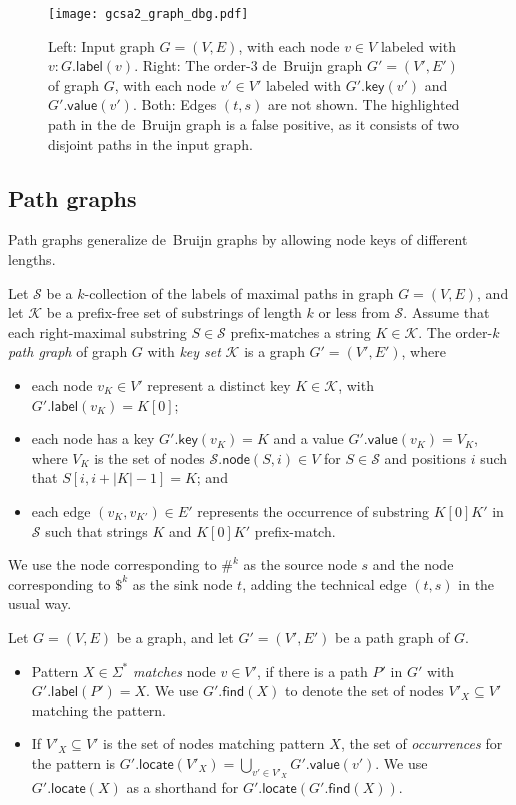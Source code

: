 \documentclass[a4paper,UKenglish]{lipics-v2016}
\newcommand{\abs}[1]{\ensuremath{\lvert #1 \rvert}}
\newcommand{\find}{\ensuremath{\mathsf{find}}}
\newcommand{\locate}{\ensuremath{\mathsf{locate}}}
\newcommand{\glabel}{\ensuremath{\mathsf{label}}}
\newcommand{\gkey}{\ensuremath{\mathsf{key}}}
\newcommand{\gvalue}{\ensuremath{\mathsf{value}}}
\newcommand{\gnode}{\ensuremath{\mathsf{node}}}
\newcommand{\kcollection}[1]{$#1$\nobreakdash-collection}
\newcommand{\orderk}[1]{order\nobreakdash-$#1$}
\begin{document}
\begin{figure}[t!]
\texttt{[image: gcsa2\_graph\_dbg.pdf]}
\caption{Left: Input graph $G = (V, E)$, with each node $v \in V$ labeled with $v:G.\glabel(v)$. Right: The \orderk{3} de~Bruijn graph $G' = (V', E')$ of graph $G$, with each node $v' \in V'$ labeled with $G'.\gkey(v')$ and $G'.\gvalue(v')$. Both: Edges $(t, s)$ are not shown. The highlighted path in the de~Bruijn graph is a false positive, as it consists of two disjoint paths in the input graph.}\label{figure:graph-dbg}
\end{figure}

\subsection{Path graphs}

Path graphs generalize de~Bruijn graphs by allowing node keys of different lengths.

\begin{definition}
Let $\mathcal{S}$ be a \kcollection{k} of the labels of maximal paths in graph $G = (V, E)$, and let $\mathcal{K}$ be a prefix-free set of substrings of length $k$ or less from $\mathcal{S}$. Assume that each right-maximal substring $S \in \mathcal{S}$ prefix-matches a string $K \in \mathcal{K}$. The \orderk{k} \emph{path graph} of graph $G$ with \emph{key set} $\mathcal{K}$ is a graph $G' = (V', E')$, where
\begin{itemize}
\item each node $v_{K} \in V'$ represent a distinct key $K \in \mathcal{K}$, with $G'.\glabel(v_{K}) = K[0]$;
\item each node has a key $G'.\gkey(v_{K}) = K$ and a value $G'.\gvalue(v_{K}) = V_{K}$, where $V_{K}$ is the set of nodes $\mathcal{S}.\gnode(S, i) \in V$ for $S \in \mathcal{S}$ and positions $i$ such that $S[i, i+\abs{K}-1] = K$; and
\item each edge $(v_{K}, v_{K'}) \in E'$ represents the occurrence of substring $K[0] K'$ in $\mathcal{S}$ such that strings $K$ and $K[0] K'$ prefix-match.
\end{itemize}
We use the node corresponding to $\#^{k}$ as the source node $s$ and the node corresponding to $\$^{k}$ as the sink node $t$, adding the technical edge $(t, s)$ in the usual way.
\end{definition}

\begin{definition}
Let $G = (V, E)$ be a graph, and let $G' = (V', E')$ be a path graph of $G$.
\begin{itemize}
\item Pattern $X \in \Sigma^{\ast}$ \emph{matches} node $v \in V'$, if there is a path $P'$ in $G'$ with $G'.\glabel(P') = X$. We use $G'.\find(X)$ to denote the set of nodes $V'_{X} \subseteq V'$ matching the pattern.
\item If $V'_{X} \subseteq V'$ is the set of nodes matching pattern $X$, the set of \emph{occurrences} for the pattern is $G'.\locate(V'_{X}) = \bigcup_{v' \in V'_{X}} G'.\gvalue(v')$. We use $G'.\locate(X)$ as a shorthand for $G'.\locate(G'.\find(X))$.
\end{itemize}
\end{definition}
\end{document}
